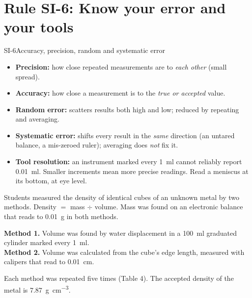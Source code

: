 \documentclass[11pt]{article}
\begin{document}
\section{Rule SI-6: Know your error and your tools}

\begin{rulebox}{SI-6}{Accuracy, precision, random and systematic error}
\begin{itemize}
\item \textbf{Precision:} how close repeated measurements are to \emph{each other} (small spread).
\item \textbf{Accuracy:} how close a measurement is to the \emph{true or accepted} value.
\item \textbf{Random error:} scatters results both high and low; reduced by repeating and averaging.
\item \textbf{Systematic error:} shifts every result in the \emph{same} direction (an untared balance, a mis-zeroed ruler); averaging does \emph{not} fix it.
\item \textbf{Tool resolution:} an instrument marked every \SI{1}{\milli\litre} cannot reliably report \SI{0.01}{\milli\litre}. Smaller increments mean more precise readings. Read a meniscus at its bottom, at eye level.
\end{itemize}
\end{rulebox}

Students measured the density of identical cubes of an unknown metal by two methods. Density $=$ mass $\div$ volume. Mass was found on an electronic balance that reads to \SI{0.01}{\gram} in both methods.

\textbf{Method 1.} Volume was found by water displacement in a \SI{100}{\milli\litre} graduated cylinder marked every \SI{1}{\milli\litre}.\\
\textbf{Method 2.} Volume was calculated from the cube's edge length, measured with calipers that read to \SI{0.01}{\centi\metre}.

Each method was repeated five times (Table 4). The accepted density of the metal is \SI{7.87}{\gram\per\centi\metre\cubed}.

\passageend
\end{document}
